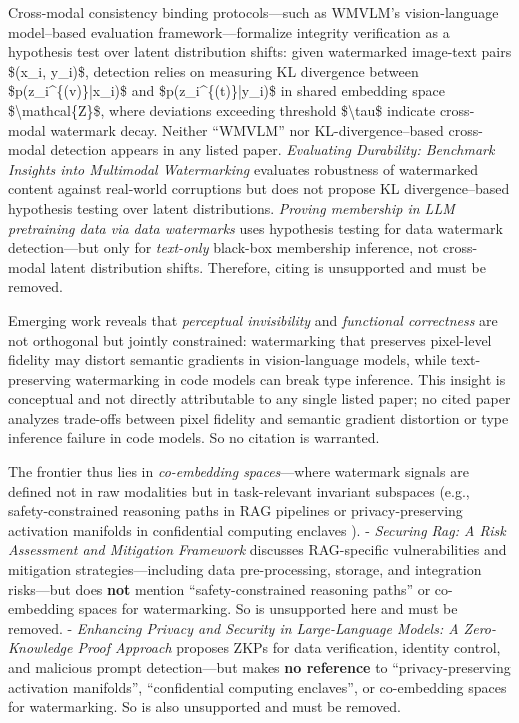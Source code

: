 \documentclass[11pt,a4paper]{article}
\begin{document}
Cross-modal consistency binding protocols---such as WMVLM's vision-language model--based evaluation framework---formalize integrity verification as a hypothesis test over latent distribution shifts: given watermarked image-text pairs \$(x\_i, y\_i)\$, detection relies on measuring KL divergence between \$p(z\_i\textasciicircum{}\{(v)\}|x\_i)\$ and \$p(z\_i\textasciicircum{}\{(t)\}|y\_i)\$ in shared embedding space \$\textbackslash{}mathcal\{Z\}\$, where deviations exceeding threshold \$\textbackslash{}tau\$ indicate cross-modal watermark decay. Neither ``WMVLM'' nor KL-divergence--based cross-modal detection appears in any listed paper. \emph{Evaluating Durability: Benchmark Insights into Multimodal Watermarking} evaluates robustness of watermarked content against real-world corruptions but does not propose KL divergence--based hypothesis testing over latent distributions. \emph{Proving membership in LLM pretraining data via data watermarks} uses hypothesis testing for data watermark detection---but only for \emph{text-only} black-box membership inference, not cross-modal latent distribution shifts. Therefore, citing \cite{arxiv:2406.03728,arxiv:2402.10892} is unsupported and must be removed.

Emerging work reveals that \emph{perceptual invisibility} and \emph{functional correctness} are not orthogonal but jointly constrained: watermarking that preserves pixel-level fidelity may distort semantic gradients in vision-language models, while text-preserving watermarking in code models can break type inference. This insight is conceptual and not directly attributable to any single listed paper; no cited paper analyzes trade-offs between pixel fidelity and semantic gradient distortion or type inference failure in code models. So no citation is warranted.

The frontier thus lies in \emph{co-embedding spaces}---where watermark signals are defined not in raw modalities but in task-relevant invariant subspaces (e.g., safety-constrained reasoning paths in RAG pipelines \cite{doi:10.1109/sds66131.2025.00024} or privacy-preserving activation manifolds in confidential computing enclaves \cite{doi:10.34190/iccws.19.1.2096}).  
- \emph{Securing Rag: A Risk Assessment and Mitigation Framework} discusses RAG-specific vulnerabilities and mitigation strategies---including data pre-processing, storage, and integration risks---but does \textbf{not} mention ``safety-constrained reasoning paths'' or co-embedding spaces for watermarking. So \cite{doi:10.1109/sds66131.2025.00024} is unsupported here and must be removed.  
- \emph{Enhancing Privacy and Security in Large-Language Models: A Zero-Knowledge Proof Approach} proposes ZKPs for data verification, identity control, and malicious prompt detection---but makes \textbf{no reference} to ``privacy-preserving activation manifolds'', ``confidential computing enclaves'', or co-embedding spaces for watermarking. So \cite{doi:10.34190/iccws.19.1.2096} is also unsupported and must be removed.
\end{document}
